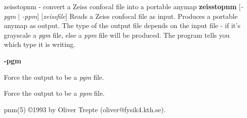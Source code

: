 zeisstopnm - convert a Zeiss confocal file into a portable anymap
{\bf zeisstopnm}
{\rm [}{\it -pgm}
$|$
{\it -ppm}{\rm ]}
{\rm [}{\it zeissfile}{\rm ]}
Reads a Zeiss confocal file as input.
Produces a portable anymap as output.
The type of the output file depends on the input file -
if it's grayscale a
{\it pgm}
file, else a
{\it ppm}
file will be produced.
The program tells you which type it is writing.
\begin{TPlist}{{\bf -pgm}}
\item[{{\bf -pgm}}]
Force the output to be a
{\it pgm}
file.
\item[{{\bf -ppm}}]
Force the output to be a
{\it ppm}
file.
\end{TPlist}

pnm(5)
\copyright 1993 by Oliver Trepte (oliver@fysik4.kth.se).
%

